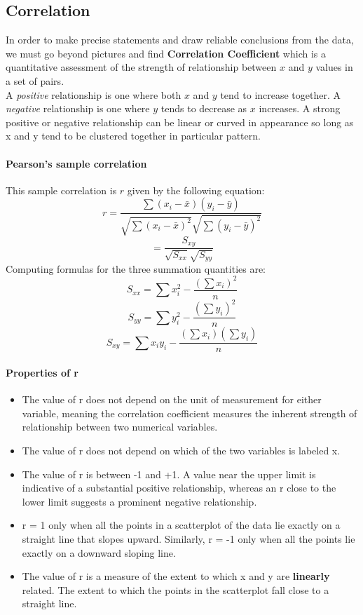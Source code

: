 \documentclass{article}
\newcommand{\p}[1]{\paragraph{#1}} %
\begin{document}
	\subsection{Correlation} %
	In order to make precise statements and draw reliable conclusions from the data, we must 
	go beyond pictures and find \textbf{Correlation Coefficient} which is a quantitative 
	assessment of the strength of relationship between $x$ and $y$ values in a set of pairs. \\
	
	A \textit{positive} relationship is one where both $x$ and $y$ tend to increase together. A 
	\textit{negative} relationship is one where $y$ tends to decrease as $x$ increases. A 
	strong positive or negative relationship can be linear or curved in appearance so long as x 
	and y tend to be clustered together in particular pattern.
		
	\p{Pearson's sample correlation}
		This sample correlation is $r$ given by the following equation:
		\[ r = \frac{\sum(x_i-\bar{x})(y_i-\bar{y})}{\sqrt{\sum(x_i-\bar{x})^2}\sqrt{\sum(y_i-\bar{y})^2}}  
		\]
		\[ = \frac{S_{xy}}{\sqrt{S_{xx}}\sqrt{S_{yy}}} \]
		Computing formulas for the three summation quantities are:
		\[ S_{xx} = \sum x_i^2-\frac{\left(\sum x_i\right)^2}{n} \]
		\[ S_{yy} = \sum y_i^2-\frac{\left(\sum y_i\right)^2}{n} \]
		\[ S_{xy} = \sum x_iy_i-\frac{\left(\sum x_i\right)\left(\sum y_i\right)}{n} \]
		
	\p{Properties of r}
		\begin{itemize}
			\item{The value of r does not depend on the unit of measurement for either variable, 
			meaning the correlation coefficient measures the inherent strength of relationship 
			between two numerical variables.}
		
			\item{The value of r does not depend on which of the two variables is labeled x.}
		
			\item{The value of r is between -1 and +1. A value near the upper limit is indicative of 
			a substantial positive relationship, whereas an r close to the lower limit suggests a 
			prominent negative relationship. }
		
			\item{r = 1 only when all the points in a scatterplot of the data lie exactly on a straight 
			line that slopes upward. Similarly, r = -1 only when all the points lie exactly on a 
			downward sloping line.}
		
			\item{The value of r is a measure of the extent to which x and y are \textbf{linearly} 
			related. The extent to which the points in the scatterplot fall close to a straight line.}
		\end{itemize}
		
\end{document}
